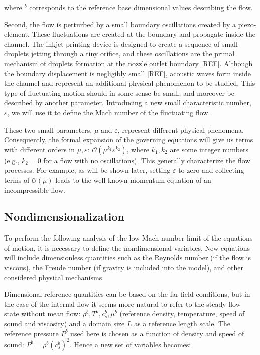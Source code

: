 where $^b$ corresponds to the reference base dimensional values describing the flow.

Second, the flow is perturbed by a small boundary oscillations created by a piezo-element. These fluctuations are created at the boundary and propagate inside the channel. The inkjet printing device is designed to create a sequence of small droplets jetting through a tiny orifice, and these oscillations are the primal mechanism of droplets formation at the nozzle outlet boundary [REF]. Although the boundary displacement is negligibly small [REF], acoustic waves form inside the channel and represent an additional physical phenomenon to be studied. This type of fluctuating motion should in some sense be small, and moreover be described by another parameter. Introducing a new small characteristic number, $\varepsilon$, we will use it to define the Mach number of the fluctuating flow.

These two small parameters, $\mu$ and $\varepsilon$, represent different physical phenomena. Consequently, the formal expansion of the governing equations will give us terms with different orders in $\mu, \varepsilon$: $\mathcal{O}(\mu^{k_1}\varepsilon^{k_2})$, where $k_1, k_2$ are some integer numbers (e.g., $k_2 = 0$ for a flow with no oscillations). This generally characterize the flow processes. For example, as will be shown later, setting $\varepsilon$ to zero and collecting terms of $\mathcal{O}(\mu)$ leads to the well-known momentum equation of an incompressible flow.

\subsection{Nondimensionalization}

To perform the following analysis of the low Mach number limit of the equations of motion, it is necessary to define the nondimensional variables. New equations will include dimensionless quantities such as the Reynolds number (if the flow is viscous), the Freude number (if gravity is included into the model), and other considered physical mechanisms.

Dimensional reference quantities can be based on the far-field conditions, but in the case of the internal flow it seems more natural to refer to the steady flow state without mean flow: $\rho^b, T^b, c_s^b, \mu^b$ (reference density, temperature, speed of sound and viscosity) and a domain size $L$ as a reference length scale. The reference pressure $P^b$ used here is chosen as a function of density and speed of sound: $P^b = \rho^b (c_s^b)^2$. Hence a new set of variables becomes:

